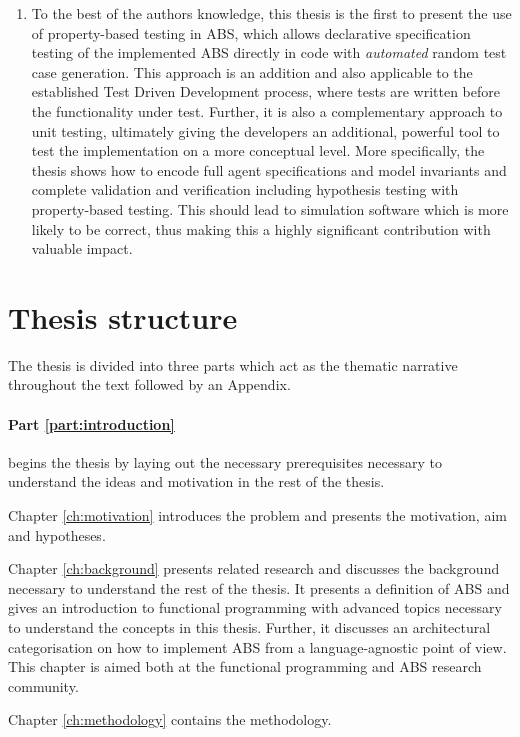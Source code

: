 \begin{enumerate}
	\item To the best of the authors knowledge, this thesis is the first to present the use of property-based testing in ABS, which allows declarative specification testing of the implemented ABS directly in code with \textit{automated} random test case generation. This approach is an addition and also applicable to the established Test Driven Development process, where tests are written before the functionality under test. Further, it is also a complementary approach to unit testing, ultimately giving the developers an additional, powerful tool to test the implementation on a more conceptual level. More specifically, the thesis shows how to encode full agent specifications and model invariants and complete validation and verification including hypothesis testing with property-based testing. This should lead to simulation software which is more likely to be correct, thus making this a highly significant contribution with valuable impact.
\end{enumerate}

\section{Thesis structure}
The thesis is divided into three parts which act as the thematic narrative throughout the text followed by an Appendix. 

\paragraph{Part \ref{part:introduction}} begins the thesis by laying out the necessary prerequisites necessary to understand the ideas and motivation in the rest of the thesis.
\medskip

Chapter \ref{ch:motivation} introduces the problem and presents the motivation, aim and hypotheses.

\medskip

Chapter \ref{ch:background} presents related research and discusses the background necessary to understand the rest of the thesis. It presents a definition of ABS and gives an introduction to functional programming with advanced topics necessary to understand the concepts in this thesis. Further, it discusses an architectural categorisation on how to implement ABS from a language-agnostic point of view. This chapter is aimed both at the functional programming and ABS research community.

\medskip

Chapter \ref{ch:methodology} contains the methodology.

